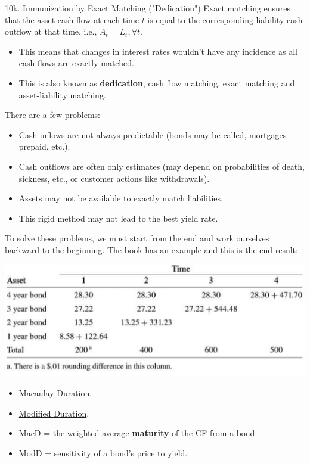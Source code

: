 \begin{CHPT_SUMM_AUTO}[label = {L.-10k}]{10k. Immunization by Exact Matching ("Dedication")}
Exact matching ensures that the asset cash flow at each time $t$ is equal to the corresponding liability cash outflow at that time, i.e., $A_{t} = L_{t}, \forall t$.

\begin{itemize}[leftmargin = *]
	\item	This means that changes in interest rates wouldn't have any incidence as all cash flows are exactly matched.
	\item	This is also known as \textbf{dedication}, cash flow matching, exact matching and asset-liability matching.
\end{itemize}

There are a few problems:

\begin{itemize}[leftmargin = *]
	\item	Cash inflows are not always predictable (bonds may be called, mortgages prepaid, etc.).
	\item	Cash outflows are often only estimates (may depend on probabilities of death, sickness, etc., or customer actions like withdrawals).
	\item	Assets may not be available to exactly match liabilities.
	\item	This rigid method may not lead to the best yield rate.
\end{itemize}

To solve these problems, we must start from the end and work ourselves backward to the beginning. The book has an example and this is the end result:
\begin{center}
	\includegraphics[scale=0.4]{img/immunization-exact.png}
\end{center}
\end{CHPT_SUMM_AUTO}



\begin{YTB_vids}
\begin{itemize}
	\item	\href{https://www.youtube.com/watch?v=F7XnR7sKWiE&list=PL_KGEFWqEaTBbYDupRektHIMG0G9u-Ru-&index=54&t=0s}{Macaulay Duration}.
	\item	\href{https://www.youtube.com/watch?v=rdDfmlerTcI&list=PL_KGEFWqEaTBbYDupRektHIMG0G9u-Ru-&index=53&t=0s}{Modified Duration}.
\end{itemize}
\end{YTB_vids}

\begin{itemize}
	\item	MacD = the weighted-average \textbf{maturity} of the CF from a bond.
	\item	ModD = sensitivity of a bond's price to yield.
\end{itemize}